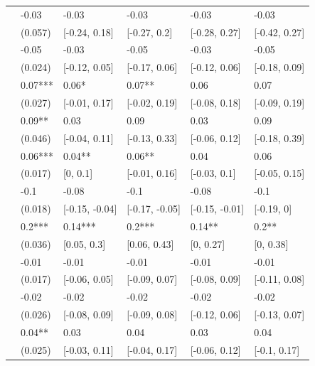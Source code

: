 \documentclass[
  12pt]{article}
\theoremstyle{definition}
\theoremstyle{remark}
\begin{document}
\begin{table}
{\begin{tabular}[t]{r|l|l|l|l|l}
\cline{1-6}
 & -0.03 & -0.03 & -0.03 & -0.03 & -0.03\\
\cline{2-6}
\multirow[t]{-2}{*}{\raggedleft\arraybackslash 332} & (0.057) & [-0.24, 0.18] & [-0.27, 0.2] & [-0.28, 0.27] & [-0.42, 0.27]\\
\cline{1-6}
 & -0.05 & -0.03 & -0.05 & -0.03 & -0.05\\
\cline{2-6}
\multirow[t]{-2}{*}{\raggedleft\arraybackslash 341} & (0.024) & [-0.12, 0.05] & [-0.17, 0.06] & [-0.12, 0.06] & [-0.18, 0.09]\\
\cline{1-6}
 & 0.07*** & 0.06* & 0.07** & 0.06 & 0.07\\
\cline{2-6}
\multirow[t]{-2}{*}{\raggedleft\arraybackslash 342} & (0.027) & [-0.01, 0.17] & [-0.02, 0.19] & [-0.08, 0.18] & [-0.09, 0.19]\\
\cline{1-6}
 & 0.09** & 0.03 & 0.09 & 0.03 & 0.09\\
\cline{2-6}
\multirow[t]{-2}{*}{\raggedleft\arraybackslash 351} & (0.046) & [-0.04, 0.11] & [-0.13, 0.33] & [-0.06, 0.12] & [-0.18, 0.39]\\
\cline{1-6}
 & 0.06*** & 0.04** & 0.06** & 0.04 & 0.06\\
\cline{2-6}
\multirow[t]{-2}{*}{\raggedleft\arraybackslash 352} & (0.017) & [0, 0.1] & [-0.01, 0.16] & [-0.03, 0.1] & [-0.05, 0.15]\\
\cline{1-6}
 & -0.1 & -0.08 & -0.1 & -0.08 & -0.1\\
\cline{2-6}
\multirow[t]{-2}{*}{\raggedleft\arraybackslash 356} & (0.018) & [-0.15, -0.04] & [-0.17, -0.05] & [-0.15, -0.01] & [-0.19, 0]\\
\cline{1-6}
 & 0.2*** & 0.14*** & 0.2*** & 0.14** & 0.2**\\
\cline{2-6}
\multirow[t]{-2}{*}{\raggedleft\arraybackslash 369} & (0.036) & [0.05, 0.3] & [0.06, 0.43] & [0, 0.27] & [0, 0.38]\\
\cline{1-6}
 & -0.01 & -0.01 & -0.01 & -0.01 & -0.01\\
\cline{2-6}
\multirow[t]{-2}{*}{\raggedleft\arraybackslash 381} & (0.017) & [-0.06, 0.05] & [-0.09, 0.07] & [-0.08, 0.09] & [-0.11, 0.08]\\
\cline{1-6}
 & -0.02 & -0.02 & -0.02 & -0.02 & -0.02\\
\cline{2-6}
\multirow[t]{-2}{*}{\raggedleft\arraybackslash 382} & (0.026) & [-0.08, 0.09] & [-0.09, 0.08] & [-0.12, 0.06] & [-0.13, 0.07]\\
\cline{1-6}
 & 0.04** & 0.03 & 0.04 & 0.03 & 0.04\\
\cline{2-6}
\multirow[t]{-2}{*}{\raggedleft\arraybackslash 383} & (0.025) & [-0.03, 0.11] & [-0.04, 0.17] & [-0.06, 0.12] & [-0.1, 0.17]\\

\end{tabular}}
\end{table}
\end{document}
